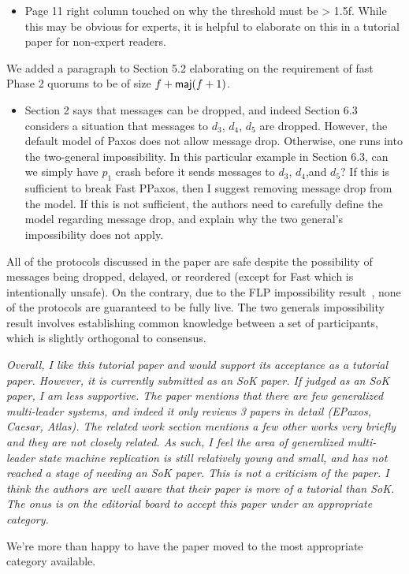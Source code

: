 \documentclass[letterpaper,twocolumn,10pt]{article}
\newenvironment{reviewerquote}
{\list{}{\leftmargin=\parindent\rightmargin=0in}\item[] \itshape \color{ReviewerDarkGray}}%
{\endlist}
\begin{document}
\begin{reviewerquote}
  \begin{itemize}
    \item
      Page 11 right column touched on why the threshold must be > 1.5f. While
      this may be obvious for experts, it is helpful to elaborate on this in a
      tutorial paper for non-expert readers.
  \end{itemize}
\end{reviewerquote}

We added a paragraph to Section 5.2 elaborating on the requirement of fast
Phase 2 quorums to be of size $f + \textsf{maj}(f+1)$.

\begin{reviewerquote}
  \begin{itemize}
    \item
      Section 2 says that messages can be dropped, and indeed Section 6.3
      considers a situation that messages to $d_3$, $d_4$, $d_5$ are dropped.
      However, the default model of Paxos does not allow message drop.
      Otherwise, one runs into the two-general impossibility. In this
      particular example in Section 6.3, can we simply have $p_1$ crash before
      it sends messages to $d_3$, $d_4$,and $d_5$? If this is sufficient to
      break Fast PPaxos, then I suggest removing message drop from the model.
      If this is not sufficient, the authors need to carefully define the model
      regarding message drop, and explain why the two general's impossibility
      does not apply.
  \end{itemize}
\end{reviewerquote}

All of the protocols discussed in the paper are safe despite the possibility of
messages being dropped, delayed, or reordered (except for Fast \BPaxos{} which
is intentionally unsafe). On the contrary, due to the FLP impossibility
result~\cite{fischer1982impossibility}, none of the protocols are guaranteed to
be fully live. The two generals impossibility result involves establishing
common knowledge between a set of participants, which is slightly orthogonal to
consensus.

\begin{reviewerquote}
  Overall, I like this tutorial paper and would support its acceptance as a
  tutorial paper. However, it is currently submitted as an SoK paper. If judged
  as an SoK paper, I am less supportive. The paper mentions that there are few
  generalized multi-leader systems, and indeed it only reviews 3 papers in
  detail (EPaxos, Caesar, Atlas). The related work section mentions a few other
  works very briefly and they are not closely related. As such, I feel the area
  of generalized multi-leader state machine replication is still relatively
  young and small, and has not reached a stage of needing an SoK paper. This is
  not a criticism of the paper. I think the authors are well aware that their
  paper is more of a tutorial than SoK. The onus is on the editorial board to
  accept this paper under an appropriate category.
\end{reviewerquote}

We're more than happy to have the paper moved to the most appropriate category
available.




\end{document}
